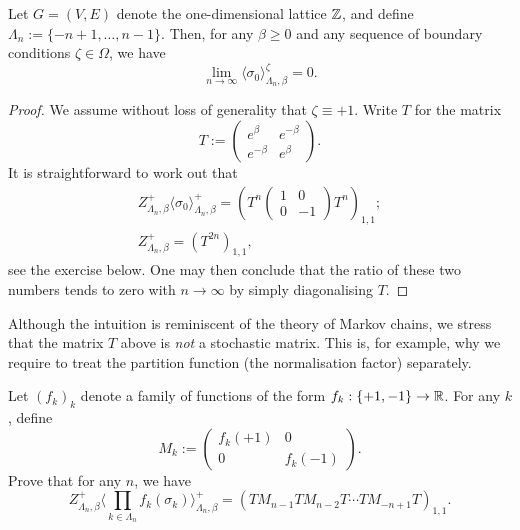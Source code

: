 \begin{theorem}[Ising, 1924]
    Let $G=(V,E)$ denote the one-dimensional lattice $\mathbb Z$,
    and define $\Lambda_n:=\{-n+1,\ldots,n-1\}$.
    Then, for any $\beta\geq 0$ and any sequence of boundary conditions $\zeta\in\Omega$, we have
    \[
        \lim_{n\to\infty}\langle\sigma_0\rangle_{\Lambda_n,\beta}^\zeta
        =
        0
        .
    \]
\end{theorem}

\begin{proof}
    We assume without loss of generality
    that $\zeta\equiv +1$.
    Write $T$ for the matrix
    \[
        T:=
        \begin{pmatrix}
            e^{\beta} & e^{-\beta} \\
            e^{-\beta} & e^{\beta}
        \end{pmatrix}.
    \]
    It is straightforward to work out that
    \begin{gather}
        Z_{\Lambda_n,\beta}^+\langle\sigma_0\rangle_{\Lambda_n,\beta}^+
        =
        \left(T^n
            \begin{pmatrix}
                1 & 0 \\ 0 & -1
            \end{pmatrix}
            T^n
            \right)_{1,1};
        \\
        Z_{\Lambda_n,\beta}^+ = \left(T^{2n}\right)_{1,1},
    \end{gather}
    see the exercise below.
    One may then conclude that the ratio of these two numbers tends to zero 
    with $n\to\infty$
    by simply diagonalising $T$.
\end{proof}

\begin{remark}
    Although the intuition is reminiscent
    of the theory of Markov chains, we stress that the matrix
    $T$ above is \emph{not} a stochastic matrix.
    This is, for example, why we require to treat the partition function
    (the normalisation factor) separately.
\end{remark}

\begin{exercise}
    Let $(f_k)_k$ denote a family of functions
    of the form $f_k:\{+1,-1\}\to\mathbb R$.
    For any $k$, define
    \[ M_k:=\begin{pmatrix}
        f_{k}(+1) & 0 \\
        0 & f_{k}(-1)
    \end{pmatrix}.\] 
    Prove that for any $n$,
    we have
    \[
        Z_{\Lambda_n,\beta}^+
        \langle\textstyle\prod_{k\in\Lambda_n} f_k(\sigma_{k})\rangle_{\Lambda_n,\beta}^+
        =
        \left(
            T
            M_{n-1}
            T
            M_{n-2}
            T
            \cdots
            T
            M_{-n+1}
            T
        \right)_{1,1}.
    \]
\end{exercise}

